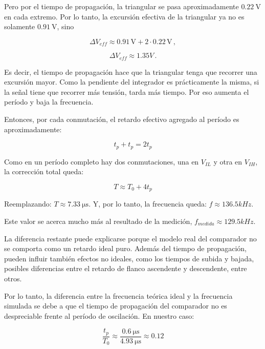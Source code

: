 Pero por el tiempo de propagación, la triangular se pasa aproximadamente
$\SI{0.22}{\volt}$ en cada extremo. Por lo tanto, la excursión efectiva de la triangular
ya no es solamente $\SI{0.91}{\volt}$, sino

\begin{equation*}
    \Delta V_{eff} \approx 0.91\,\text{V} + 2 \cdot 0.22\,\text{V}\,,
\end{equation*}

\begin{equation*}
    \Delta V_{eff} \approx 1.35V\,.
\end{equation*}

Es decir, el tiempo de propagación hace que la triangular tenga que recorrer una
excursión mayor. Como la pendiente del integrador es prácticamente la misma, si
la señal tiene que recorrer más tensión, tarda más tiempo. Por eso aumenta el
período y baja la frecuencia.

Entonces, por cada conmutación, el retardo efectivo agregado al período es
aproximadamente:

\begin{equation*}
    t_p + t_p = 2t_p
\end{equation*}

Como en un período completo hay dos conmutaciones, una en $V_{IL}$ y otra en
$V_{IH}$, la corrección total queda:

\begin{equation*}
    T \approx T_0 + 4t_p
\end{equation*}

Reemplazando: $T \approx \SI{7.33}{\micro\second}$. Y, por lo tanto, la frecuencia queda: $f \approx 136.5kHz$.

Este valor se acerca mucho más al resultado de la medición, $f_{medida} \approx 129.5kHz$.

La diferencia restante puede explicarse porque el modelo real del comparador no
se comporta como un retardo ideal puro. Además del tiempo de propagación, pueden influir también efectos no ideales, como los tiempos de subida y bajada, posibles diferencias entre el retardo de flanco ascendente y descendente, entre otros.

Por lo tanto, la diferencia entre la frecuencia teórica ideal y la frecuencia
simulada se debe a que el tiempo de propagación del comparador no es despreciable
frente al período de oscilación. En nuestro caso:

\begin{equation*}
    \frac{t_p}{T_0} \approx \frac{\SI{0.6}{\micro\second}}{\SI{4.93}{\micro\second}} \approx 0.12
\end{equation*}

